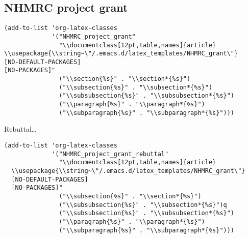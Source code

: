 \documentclass[12pt]{article}
\begin{document}
\subsection{NHMRC project grant}
\label{sec:orgac80cb0}

\begin{verbatim}
(add-to-list 'org-latex-classes
             '("NHMRC_project_grant"
               "\\documentclass[12pt,table,names]{article}
\\usepackage{\\string~\"/.emacs.d/latex_templates/NHMRC_grant\"}
[NO-DEFAULT-PACKAGES]
[NO-PACKAGES]"
               ("\\section{%s}" . "\\section*{%s}")
               ("\\subsection{%s}" . "\\subsection*{%s}")
               ("\\subsubsection{%s}" . "\\subsubsection*{%s}")
               ("\\paragraph{%s}" . "\\paragraph*{%s}")
               ("\\subparagraph{%s}" . "\\subparagraph*{%s}")))
\end{verbatim}
Rebuttal\ldots{}
\begin{verbatim}
(add-to-list 'org-latex-classes
             '("NHMRC_project_grant_rebuttal"
               "\\documentclass[12pt,table,names]{article}
  \\usepackage{\\string~\"/.emacs.d/latex_templates/NHMRC_grant\"}
  [NO-DEFAULT-PACKAGES]
  [NO-PACKAGES]"
               ("\\subsection{%s}" . "\\section*{%s}")
               ("\\subsubsection{%s}" . "\\subsection*{%s}")q
               ("\\subsubsection{%s}" . "\\subsubsection*{%s}")
               ("\\paragraph{%s}" . "\\paragraph*{%s}")
               ("\\subparagraph{%s}" . "\\subparagraph*{%s}")))

\end{verbatim}
\end{document}
